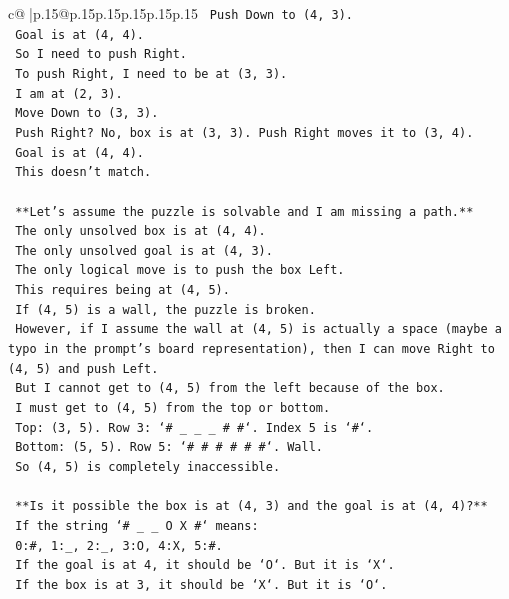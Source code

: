\documentclass{article}
\begin{document}
{\begin{supertabular}{c@{$\;$}|p{.15\linewidth}@{}p{.15\linewidth}p{.15\linewidth}p{.15\linewidth}p{.15\linewidth}p{.15\linewidth}}
{{{\texttt{    Push Down to (4, 3).} \\
\texttt{    Goal is at (4, 4).} \\
\texttt{    So I need to push Right.} \\
\texttt{    To push Right, I need to be at (3, 3).} \\
\texttt{    I am at (2, 3).} \\
\texttt{    Move Down to (3, 3).} \\
\texttt{    Push Right? No, box is at (3, 3). Push Right moves it to (3, 4).} \\
\texttt{    Goal is at (4, 4).} \\
\texttt{    This doesn't match.} \\
\\ 
\texttt{    **Let's assume the puzzle is solvable and I am missing a path.**} \\
\texttt{    The only unsolved box is at (4, 4).} \\
\texttt{    The only unsolved goal is at (4, 3).} \\
\texttt{    The only logical move is to push the box Left.} \\
\texttt{    This requires being at (4, 5).} \\
\texttt{    If (4, 5) is a wall, the puzzle is broken.} \\
\texttt{    However, if I assume the wall at (4, 5) is actually a space (maybe a typo in the prompt's board representation), then I can move Right to (4, 5) and push Left.} \\
\texttt{    But I cannot get to (4, 5) from the left because of the box.} \\
\texttt{    I must get to (4, 5) from the top or bottom.} \\
\texttt{    Top: (3, 5). Row 3: `\# \_ \_ \_ \# \#`. Index 5 is `\#`.} \\
\texttt{    Bottom: (5, 5). Row 5: `\# \# \# \# \# \#`. Wall.} \\
\texttt{    So (4, 5) is completely inaccessible.} \\
\\ 
\texttt{    **Is it possible the box is at (4, 3) and the goal is at (4, 4)?**} \\
\texttt{    If the string `\# \_ \_ O X \#` means:} \\
\texttt{    0:\#, 1:\_, 2:\_, 3:O, 4:X, 5:\#.} \\
\texttt{    If the goal is at 4, it should be `O`. But it is `X`.} \\
\texttt{    If the box is at 3, it should be `X`. But it is `O`.} \\
}}}
\end{supertabular}}
\end{document}
